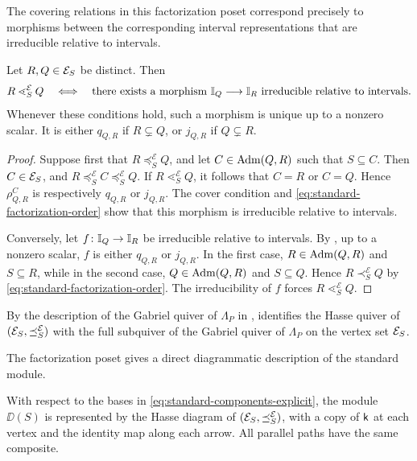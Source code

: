 The covering relations in this factorization poset correspond
precisely to morphisms between the corresponding interval
representations that are irreducible relative to intervals.

\begin{proposition}
\label{prop:standard-factorization-poset-covers}
Let $R,Q\in\mathcal E_S$ be distinct. Then
\begin{equation}
R\lessdot_S^{\mathcal E}Q
\quad\Longleftrightarrow\quad
\text{there exists a morphism }
\mathbb I_Q\longrightarrow\mathbb I_R
\text{ irreducible relative to intervals}.
\label{eq:standard-factorization-covers}
\end{equation}
Whenever these conditions hold, such a morphism is unique up to a
nonzero scalar. It is either $q_{Q,R}$ if $R\subsetneq Q$, or
$j_{Q,R}$ if $Q\subsetneq R$.
\end{proposition}

\begin{proof}
Suppose first that
$R\preceq_S^{\mathcal E}Q$, and let
$C\in\operatorname{Adm}(Q,R)$ such that $S\subseteq C$.
Then $C\in\mathcal E_S$, and
$R\preceq_S^{\mathcal E}C
\preceq_S^{\mathcal E}Q$.
If $R\lessdot_S^{\mathcal E}Q$, it follows that $C=R$ or $C=Q$.
Hence $\rho_{Q,R}^{C}$ is respectively $q_{Q,R}$ or $j_{Q,R}$.
The cover condition and
\eqref{eq:standard-factorization-order} show that this morphism is irreducible relative to intervals.

Conversely, let $f\colon\mathbb I_Q\to\mathbb I_R$ be irreducible relative to intervals.  By \cite[Proposition~6.8]{BBH25}, up to a nonzero scalar, $f$ is either $q_{Q,R}$ or $j_{Q,R}$.  In the first case,
$R\in\operatorname{Adm}(Q,R)$ and $S\subseteq R$, while in the second case,
$Q\in\operatorname{Adm}(Q,R)$ and $S\subseteq Q$.  Hence
$R\prec_S^{\mathcal E}Q$ by
\eqref{eq:standard-factorization-order}. 
The irreducibility of $f$ forces $R\lessdot_S^{\mathcal E}Q$.
\end{proof}

By the description of the Gabriel quiver of $\Lambda_P$ in
,
 identifies the Hasse
quiver of $(\mathcal E_S,\preceq_S^{\mathcal E})$ with the full subquiver of
the Gabriel quiver of $\Lambda_P$ on the vertex set $\mathcal E_S$. 

The factorization poset gives a direct diagrammatic description of the
standard module.

\begin{proposition}
\label{prop:standard-factorization-poset-model}
With respect to the bases in \eqref{eq:standard-components-explicit}, 
the module $\DD(S)$ is
represented by the Hasse diagram of
$(\mathcal E_S,\preceq_S^{\mathcal E})$, with a copy of $\mathsf{k}$ at each vertex
and the identity map along each arrow. All parallel paths have the same
composite.
\end{proposition}


